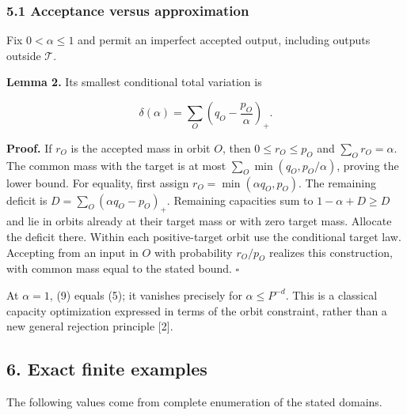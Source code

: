 \documentclass[
]{article}
\begin{document}
\subsubsection{5.1 Acceptance versus
approximation}\label{acceptance-versus-approximation}

Fix \(0<\alpha\le1\) and permit an imperfect accepted output, including
outputs outside \(\mathcal T\).

\textbf{Lemma 2.} Its smallest conditional total variation is

\[
\delta(\alpha)=\sum_O\left(q_O-\frac{p_O}{\alpha}\right)_+.
\tag{9}
\]

\textbf{Proof.} If \(r_O\) is the accepted mass in orbit \(O\), then
\(0\le r_O\le p_O\) and \(\sum_O r_O=\alpha\). The common mass with the
target is at most \(\sum_O\min(q_O,p_O/\alpha)\), proving the lower
bound. For equality, first assign \(r_O=\min(\alpha q_O,p_O)\). The
remaining deficit is \(D=\sum_O(\alpha q_O-p_O)_+\). Remaining
capacities sum to \(1-\alpha+D\ge D\) and lie in orbits already at their
target mass or with zero target mass. Allocate the deficit there. Within
each positive-target orbit use the conditional target law. Accepting
from an input in \(O\) with probability \(r_O/p_O\) realizes this
construction, with common mass equal to the stated bound. \(\square\)

At \(\alpha=1\), (9) equals (5); it vanishes precisely for
\(\alpha\le P^{-d}\). This is a classical capacity optimization
expressed in terms of the orbit constraint, rather than a new general
rejection principle {[}2{]}.

\subsection{6. Exact finite examples}\label{exact-finite-examples}

The following values come from complete enumeration of the stated
domains.
\end{document}
